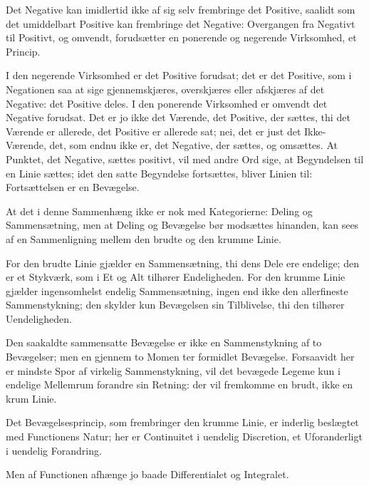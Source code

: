 \documentclass[12pt]{book}
\newcommand{\opage}[1]{\marginnote{\footnotesize\textit{[#1]}}}
\begin{document}
Det Negative kan imidlertid ikke af sig selv frembringe det Positive,
saalidt som det umiddelbart Positive kan frembringe det Negative:
Overgangen fra Negativt til Positivt, og omvendt, forudsætter en
ponerende og negerende Virksomhed, et Princip.

\opage{76} I den negerende Virksomhed er det Positive forudsat; det er det
Positive, som i Negationen saa at sige gjennemskjæres, overskjæres
eller afskjæres af det Negative: det Positive deles. I den ponerende
Virksomhed er omvendt det Negative forudsat. Det er jo ikke det
Værende, det Positive, der sættes, thi det Værende er allerede, det
Positive er allerede sat; nei, det er just det Ikke-Værende, det, som
endnu ikke er, det Negative, der sættes, og omsættes. At Punktet, det
Negative, sættes positivt, vil med andre Ord sige, at Begyndelsen til
en Linie sættes; idet den satte Begyndelse fortsættes, bliver Linien
til: Fortsættelsen er en Bevægelse.

At det i denne Sammenhæng ikke er nok med Kategorierne: Deling og
Sammensætning, men at Deling og Bevægelse bør modsættes hinanden, kan
sees af en Sammenligning mellem den brudte og den krumme Linie.

For den brudte Linie gjælder en Sammensætning, thi dens Dele ere
endelige; den er et Stykværk, som i Et og Alt tilhører Endeligheden.
For den krumme Linie gjælder ingensomhelst endelig Sammensætning,
ingen end ikke den allerfineste Sammenstykning; den skylder kun
Bevægelsen sin Tilblivelse, thi den tilhører Uendeligheden.

Den saakaldte sammensatte Bevægelse er ikke en Sammenstykning af to
Bevægelser; men en gjennem to Momen%
\opage{77}ter formidlet Bevægelse.
Forsaavidt her er mindste Spor af virkelig Sammenstykning, vil det
bevægede Legeme kun i endelige Mellemrum forandre sin Retning: der vil
fremkomme en brudt, ikke en krum Linie.

Det Bevægelsesprincip, som frembringer den krumme Linie, er inderlig
beslægtet med Functionens Natur; her er Continuitet i uendelig
Discretion, et Uforanderligt i uendelig Forandring.

Men af Functionen afhænge jo baade Differentialet og Integralet.
\end{document}
